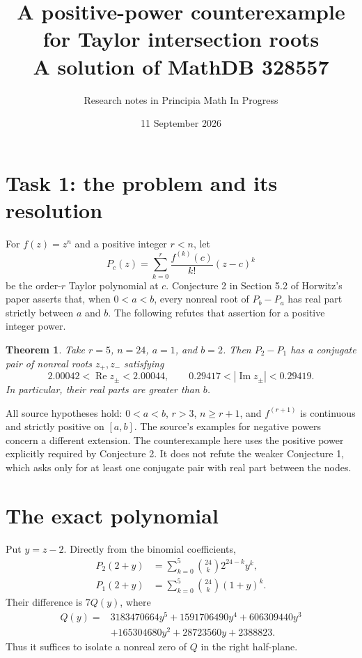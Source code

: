 \documentclass[11pt]{article}
\title{A positive-power counterexample for Taylor intersection roots\\
\large A solution of MathDB 328557}
\author{Research notes in Principia Math In Progress}
\date{11 September 2026}
\newtheorem{theorem}{Theorem}
\begin{document}
\maketitle

\section{Task 1: the problem and its resolution}
For $f(z)=z^n$ and a positive integer $r<n$, let
\[
 P_c(z)=\sum_{k=0}^r\frac{f^{(k)}(c)}{k!}(z-c)^k
\]
be the order-$r$ Taylor polynomial at $c$. Conjecture 2 in Section 5.2 of
Horwitz's paper \cite{horwitz} asserts that, when $0<a<b$, every nonreal
root of $P_b-P_a$ has real part strictly between $a$ and $b$.
The following refutes that assertion for a positive integer power.

\begin{theorem}\label{counterexample}
Take $r=5$, $n=24$, $a=1$, and $b=2$. Then $P_2-P_1$ has a conjugate pair
of nonreal roots $z_+,z_-$ satisfying
\[
 2.00042<\operatorname{Re}z_\pm<2.00044,
 \qquad 0.29417<|\operatorname{Im}z_\pm|<0.29419.
\]
In particular, their real parts are greater than $b$.
\end{theorem}
All source hypotheses hold: $0<a<b$, $r>3$, $n\geq r+1$, and
$f^{(r+1)}$ is continuous and strictly positive on $[a,b]$.
The source's examples for negative powers concern a different extension.
The counterexample here uses the positive power explicitly required by
Conjecture 2. It does not refute the weaker Conjecture 1, which asks only
for at least one conjugate pair with real part between the nodes.

\section{The exact polynomial}
Put $y=z-2$. Directly from the binomial coefficients,
\begin{align*}
 P_2(2+y)&=\sum_{k=0}^5\binom{24}{k}2^{24-k}y^k,\\
 P_1(2+y)&=\sum_{k=0}^5\binom{24}{k}(1+y)^k.
\end{align*}
Their difference is $7Q(y)$, where
\begin{align*}
 Q(y)={}&3183470664y^5+1591706490y^4+606309440y^3\\
        &+165304680y^2+28723560y+2388823.
\end{align*}
Thus it suffices to isolate a nonreal zero of $Q$ in the right half-plane.
\end{document}
